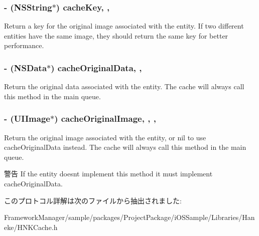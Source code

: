 \subsubsection[{cache\+Key}]{\setlength{\rightskip}{0pt plus 5cm}-\/ (N\+S\+String$\ast$) cache\+Key\hspace{0.3cm}{\ttfamily [read]}, {\ttfamily [nonatomic]}, {\ttfamily [assign]}}\label{protocol_h_n_k_cache_entity-p_aaedc8909c0704cdf10effcd7975b6464}
Return a key for the original image associated with the entity.  If two different entities have the same image, they should return the same key for better performance. \hypertarget{protocol_h_n_k_cache_entity-p_a7a5e58d8e3af6b7c72f5db77602f51f7}{}
\subsubsection[{cache\+Original\+Data}]{\setlength{\rightskip}{0pt plus 5cm}-\/ (N\+S\+Data$\ast$) cache\+Original\+Data\hspace{0.3cm}{\ttfamily [read]}, {\ttfamily [nonatomic]}, {\ttfamily [assign]}}\label{protocol_h_n_k_cache_entity-p_a7a5e58d8e3af6b7c72f5db77602f51f7}
Return the original data associated with the entity. The cache will always call this method in the main queue. \hypertarget{protocol_h_n_k_cache_entity-p_ab9759c29a625125e6eefc9d7786b6c8a}{}
\subsubsection[{cache\+Original\+Image}]{\setlength{\rightskip}{0pt plus 5cm}-\/ (U\+I\+Image$\ast$) cache\+Original\+Image\hspace{0.3cm}{\ttfamily [read]}, {\ttfamily [optional]}, {\ttfamily [nonatomic]}, {\ttfamily [assign]}}\label{protocol_h_n_k_cache_entity-p_ab9759c29a625125e6eefc9d7786b6c8a}
Return the original image associated with the entity, or nil to use cache\+Original\+Data instead. The cache will always call this method in the main queue. \begin{DoxyWarning}{警告}
If the entity doesn\textquotesingle{}t implement this method it must implement {\ttfamily cache\+Original\+Data}. 
\end{DoxyWarning}


このプロトコル詳解は次のファイルから抽出されました\+:\begin{DoxyCompactItemize}
\item 
Framework\+Manager/sample/packages/\+Project\+Package/i\+O\+S\+Sample/\+Libraries/\+Haneke/H\+N\+K\+Cache.\+h\end{DoxyCompactItemize}
